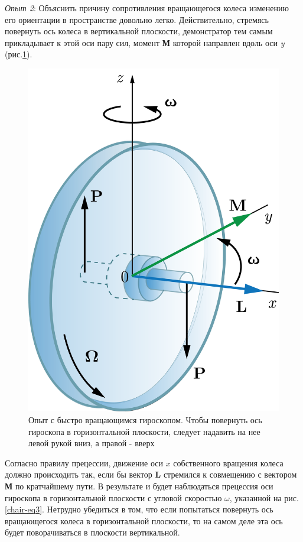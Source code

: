 \documentclass[All.tex]{subfiles}
\begin{document}
\textit{Опыт 2}:
Объяснить причину сопротивления вращающегося колеса изменению его ориентации в пространстве довольно легко.
Действительно, стремясь повернуть ось колеса в вертикальной плоскости, демонстратор тем самым прикладывает к этой оси пару сил, момент \textbf{М} которой направлен вдоль оси \textit{y} (рис.\ref{chair-3}).
	\begin{figure}[H] 	
	\centering 	
	\includegraphics[width=0.45\linewidth]{chair-3.png}
	\caption{Опыт с быстро вращающимся гироскопом. Чтобы повернуть ось гироскопа в горизонтальной плоскости, следует надавить на нее левой рукой вниз, а правой - вверх}
	\label{chair-3}
\end{figure}

Согласно правилу прецессии, движение оси $x$ собственного вращения колеса должно происходить так, если бы вектор \textbf{L} стремился к совмещению с вектором \textbf{М} по кратчайшему пути.
В результате и будет наблюдаться прецессия оси гироскопа в горизонтальной плоскости с угловой скоростью $ \omega $, указанной на рис.\ref{chair-eq3}.
Нетрудно убедиться в том, что если попытаться повернуть ось вращающегося колеса в горизонтальной плоскости, то на самом деле эта ось будет поворачиваться в плоскости вертикальной.
\end{document}
